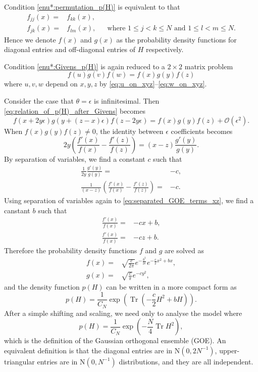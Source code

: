 \documentclass[11pt, a4paper]{article}
\numberwithin{equation}{section}
\newcommand{\bigO}{\mathcal{O}}
\newcommand{\Normal}{\mathrm{N}}
\DeclareMathOperator{\Tr}{Tr}
\theoremstyle{definition}
\theoremstyle{remark}
\begin{document}
Condition \ref{enu*:permutation_p(H)} is equivalent to that
\begin{align}
  f_{jj}(x) = {}& f_{kk}(x), && \\
  f_{jk}(x) = {}& f_{lm}(x), && \text{where $1 \leq j < k \leq N$ and $1 \leq l < m \leq N$.}
\end{align}
Hence we denote $f(x)$ and $g(x)$ as the probability density functions for diagonal entries and off-diagonal entries of $H$ respectively.

Condition \ref{enu*:Givens_p(H)} is again reduced to a $2 \times 2$ matrix problem
\begin{equation} \label{eq:relation_of_p(H)_after_Givens}
  f(u)g(v)f(w) = f(x)g(y)f(z)
\end{equation}
where $u, v, w$ depend on $x, y, z$ by \eqref{eq:u_on_xyz}--\eqref{eq:w_on_xyz}.

Consider the case that $\theta = \epsilon$ is infinitesimal. Then \eqref{eq:relation_of_p(H)_after_Givens} becomes
\begin{equation}
  f(x + 2y\epsilon) g(y + (z - x)\epsilon) f(z - 2y\epsilon) = f(x)g(y)f(z) + \bigO(\epsilon^2).
\end{equation}
When $f(x)g(y)f(z) \neq 0$, the identity between $\epsilon$ coefficients becomes
\begin{equation}
  2y \left( \frac{f'(x)}{f(x)} - \frac{f'(z)}{f(z)} \right) = (x - z) \frac{g'(y)}{g(y)}.
\end{equation}
By separation of variables, we find a constant $c$ such that
\begin{align}
  \frac{1}{2y} \frac{g'(y)}{g(y)} = {}& -c, \\
  \frac{1}{(x - z)} \left( \frac{f'(x)}{f(x)} - \frac{f'(z)}{f(z)} \right) = {}& -c. \label{eq:separated_GOE_terms_xz}
\end{align}
Using separation of variables again to \eqref{eq:separated_GOE_terms_xz}, we find a canstant $b$ such that
\begin{align}
  \frac{f'(x)}{f(x)} = {}& -cx + b, \\
  \frac{f'(x)}{f(x)} = {}& -cz + b.
\end{align}
Therefore the probability density functions $f$ and $g$ are solved as
\begin{align}
  f(x) = {}& \sqrt{\frac{c}{2\pi}}e^{-\frac{b^2}{2c}} e^{-\frac{c}{2}x^2 + bx}, \\
  g(x) = {}& \sqrt{\frac{c}{\pi}} e^{-cy^2},
\end{align}
and the density function $p(H)$ can be written in a more compact form as
\begin{equation}
  p(H) = \frac{1}{C_N} \exp(\Tr( -\frac{c}{2} H^2 + bH)).
\end{equation}
After a simple shifting and scaling, we need only to analyse the model where
\begin{equation}
  p(H) = \frac{1}{C_N} \exp(-\frac{N}{4} \Tr H^2),
\end{equation}
which is the definition of the Gaussian orthogonal ensemble (GOE). An equivalent definition is that the diagonal entries are in $\Normal(0, 2N^{-1})$, upper-triangular entries are in $\Normal(0, N^{-1})$ distributions, and they are all independent.
\end{document}
